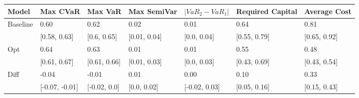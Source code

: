 \begin{tabular}{lllllll}
\toprule
   Model &       Max CVaR &      Max VaR &  Max SemiVar & $|VaR_2 - VaR_1|$ & Required Capital & Average Cost \\
\midrule
Baseline &           0.60 &         0.62 &         0.02 &              0.01 &             0.64 &         0.81 \\
         &   [0.58, 0.63] &  [0.6, 0.65] & [0.01, 0.04] &       [0.0, 0.04] &     [0.55, 0.79] & [0.65, 0.92] \\
     Opt &           0.64 &         0.63 &         0.01 &              0.01 &             0.55 &         0.48 \\
         &   [0.61, 0.67] & [0.61, 0.66] & [0.01, 0.03] &       [0.0, 0.03] &     [0.43, 0.69] & [0.43, 0.54] \\
    Diff &          -0.04 &        -0.01 &         0.01 &              0.00 &             0.10 &         0.33 \\
         & [-0.07, -0.01] & [-0.02, 0.0] &  [0.0, 0.02] &     [-0.02, 0.03] &     [0.05, 0.16] & [0.15, 0.43] \\
\bottomrule
\end{tabular}
